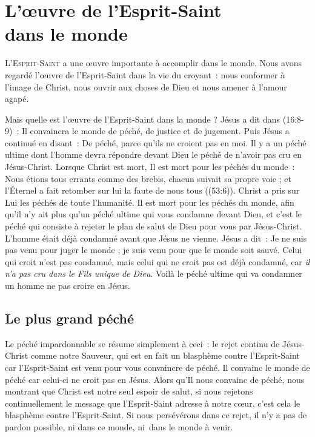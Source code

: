 \chapter[L'\oe{}uvre de l'Esprit-Saint dans le monde]{L'\oe{}uvre de l'Esprit-Saint\\ dans le monde}

\lettrine{L}{'Esprit-Saint} a une œuvre importante
 à accomplir dans le monde.
 Nous avons regardé l'œuvre de l'Esprit-Saint dans la vie du croyant~:
 nous conformer à l'image de Christ, nous ouvrir aux choses de Dieu
 et nous amener à l'amour agapé.

Mais quelle est l'œuvre de l'Esprit-Saint dans la monde ?
 Jésus a dit dans (16:8-9)~:
 \og Il convaincra le monde de péché, de justice et de jugement. \fg{}
 Puis Jésus a continué en disant~:
 \og De péché, parce qu'ils ne croient pas en moi. \fg{}
 Il y a un péché ultime dont l'homme devra répondre devant Dieu
 \ocadr le péché de n'avoir pas cru en Jésus-Christ.
 Lorsque Christ est mort, Il est mort pour les péchés du monde~:
 \og Nous étions tous errants comme des brebis,
 chacun suivait sa propre voie ;
 et l'Éternel a fait retomber sur lui la faute de nous tous \fg{}
 ((53:6)).
 Christ a pris sur Lui les péchés de toute l'humanité.
 Il est mort pour les péchés du monde, afin qu'il n'y ait plus qu'un péché
 ultime qui vous condamne devant Dieu, et c'est le péché qui consiste
 à rejeter le plan de salut de Dieu pour vous par Jésus-Christ.
 L'homme était déjà condamné avant que Jésus ne vienne.
 Jésus a dit~: \og Je ne suis pas venu pour juger le monde ;
 je suis venu pour que le monde soit sauvé.
 Celui qui croit n'est pas condamné, mais celui qui ne croit pas
 est déjà condamné, car \emph{il n'a pas cru dans le Fils
 unique de Dieu}. \fg{}
 Voilà le péché ultime qui va condamner un homme
 \ocadr ne pas croire en Jésus.


\section{Le plus grand p\'ech\'e}


Le péché impardonnable se résume simplement à ceci~:
 le rejet continu de Jésus-Christ comme notre Sauveur,
 qui est en fait un blasphème contre l'Esprit-Saint
 car l'Esprit-Saint est venu pour vous con\-vaincre de péché.
 Il \og convainc le monde de péché \fg{} car celui-ci
 ne croit pas en Jésus.
 Alors qu'Il nous convainc de péché, nous montrant que Christ
 est notre seul espoir de salut, si nous rejetons continuellement
 le message que l'Esprit-Saint adresse à notre cœur,
 c'est cela le blasphème contre l'Esprit-Saint.
 Si nous persévérons dans ce rejet, il n'y a pas de pardon possible,
 ni dans ce monde, ni~dans le monde à venir. %

